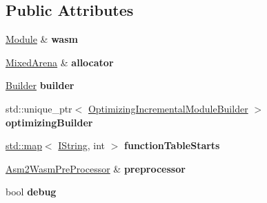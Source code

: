\subsection*{Public Attributes}
\begin{DoxyCompactItemize}
\item 
\mbox{\label{classwasm_1_1_asm2_wasm_builder_a319a674b071bdbd6e139a3582a3790a6}} 
\mbox{\hyperlink{classwasm_1_1_module}{Module}} \& {\bfseries wasm}
\item 
\mbox{\label{classwasm_1_1_asm2_wasm_builder_a1b98fa62fb0cf9bd5ea987710e41d386}} 
\mbox{\hyperlink{struct_mixed_arena}{Mixed\+Arena}} \& {\bfseries allocator}
\item 
\mbox{\label{classwasm_1_1_asm2_wasm_builder_ab7a39d5d0a2d88c9ad00172e075237d7}} 
\mbox{\hyperlink{classwasm_1_1_builder}{Builder}} {\bfseries builder}
\item 
\mbox{\label{classwasm_1_1_asm2_wasm_builder_af6f06fd82095ed980bee999f4ac78011}} 
std\+::unique\+\_\+ptr$<$ \mbox{\hyperlink{classwasm_1_1_optimizing_incremental_module_builder}{Optimizing\+Incremental\+Module\+Builder}} $>$ {\bfseries optimizing\+Builder}
\item 
\mbox{\label{classwasm_1_1_asm2_wasm_builder_af7e00e7abdacdb8e7d80e6c13b6891ca}} 
\mbox{\hyperlink{classstd_1_1map}{std\+::map}}$<$ \mbox{\hyperlink{structcashew_1_1_i_string}{I\+String}}, int $>$ {\bfseries function\+Table\+Starts}
\item 
\mbox{\label{classwasm_1_1_asm2_wasm_builder_a95fed4d36c99beedb8870da2235c3cfb}} 
\mbox{\hyperlink{structwasm_1_1_asm2_wasm_pre_processor}{Asm2\+Wasm\+Pre\+Processor}} \& {\bfseries preprocessor}
\item 
\mbox{\label{classwasm_1_1_asm2_wasm_builder_a6ada1b89fc0279a788add6c2d30aa252}} 
bool {\bfseries debug}
\item 
\mbox{\label{classwasm_1_1_asm2_wasm_builder_a3f5d37145ca855a605dce2d6996f6d9e}} 

\end{DoxyCompactItemize}
